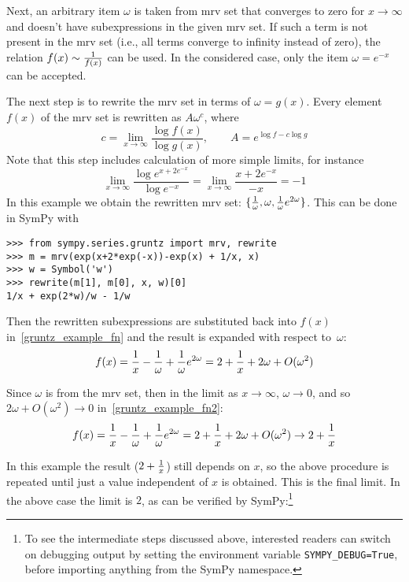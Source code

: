 Next, an arbitrary item $\omega$ is taken from mrv set that converges to zero for
$x\to\infty$ and doesn't have subexpressions in the given mrv set.  If such a term is not
present in the mrv set (i.e., all terms converge to infinity instead of zero),
the relation $f(x)\sim {1\over f(x)}$ can be used.  In the
considered case, only the item $\omega=e^{-x}$ can be accepted.

The next step is to rewrite the mrv set in terms of $\omega=g(x)$.  Every element
$f(x)$ of the mrv set is rewritten as $A \omega^c$, where
\begin{equation}
\label{gruntz_rewrite}
c = \lim\limits_{x\to\infty} \frac{\log{f(x)}}{\log{g(x)}},
\qquad
A = e^{\log f - c \log g}
\end{equation}
Note that this step includes calculation of more simple limits, for instance
\begin{equation}
	\lim\limits_{x\to\infty} \frac{\log{e^{x + 2 e^{-x}}}}{\log e^{-x}}=
	\lim\limits_{x\to\infty} \frac{x + 2 e^{-x}}{-x} = -1
\end{equation}
In this example we obtain the rewritten mrv set: $\{{1\over\omega},
\omega, {1\over\omega}e^{2\omega}\}$. This can be done in SymPy with
\begin{verbatim}
>>> from sympy.series.gruntz import mrv, rewrite
>>> m = mrv(exp(x+2*exp(-x))-exp(x) + 1/x, x)
>>> w = Symbol('w')
>>> rewrite(m[1], m[0], x, w)[0]
1/x + exp(2*w)/w - 1/w
\end{verbatim}
Then the rewritten subexpressions are
substituted back into $f(x)$ in~\eqref{gruntz_example_fn}
and the result is expanded with respect to~$\omega$:
\begin{equation}
    \label{gruntz_example_fn2}
f(x) = {1\over x}-{1\over\omega}+{1\over\omega}e^{2\omega}
     = 2+{1\over x} + 2\omega + O(\omega^2)
\end{equation}

Since $\omega$ is from the mrv set, then in the limit as $x\to\infty$,
$\omega\to0$, and so $2\omega + O(\omega^2) \to 0$ in~\eqref{gruntz_example_fn2}:
\begin{equation}
f(x) = {1\over x}-{1\over\omega}+{1\over\omega}e^{2\omega}
    = 2+{1\over x} + 2\omega + O(\omega^2)
    \to 2 + {1\over x}
\end{equation}

In this example the result ($2+{1\over x}$) still depends on $x$, so the above procedure is
repeated until just a value independent of $x$ is obtained. This is the final
limit. In the above case the limit is $2$, as can be
verified by SymPy:\footnote{\label{suppnote:gruntz}To see the intermediate steps discussed above, interested
readers can switch on debugging output by setting
the environment variable \texttt{SYMPY\_DEBUG=True}, before importing anything from
the SymPy namespace.}

